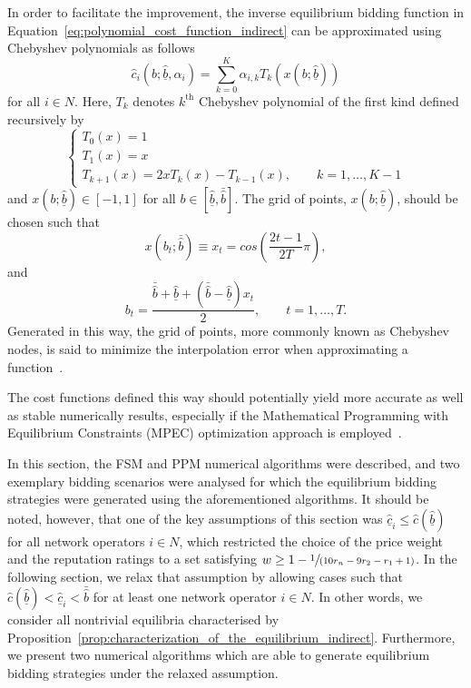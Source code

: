In order to facilitate the improvement, the inverse equilibrium bidding function in Equation~\eqref{eq:polynomial_cost_function_indirect} can be approximated using Chebyshev polynomials as follows
\begin{equation*}
  \displaystyle\hat{c}_i(b;\underline{\hat{b}},\alpha_i) = \sum_{k=0}^K \alpha_{i,k} T_k\left(x(b;\underline{\hat{b}})\right)
\end{equation*}
for all $i\in N$. Here, $T_k$ denotes $k^{\textrm{th}}$ Chebyshev polynomial of the first kind defined recursively by
\begin{equation*}
  \left\{
    \begin{array}{l}
      T_0(x) = 1\\
      T_1(x) = x\\
      T_{k+1}(x) = 2xT_k(x) - T_{k-1}(x), \qquad k=1,\ldots,K-1
    \end{array}
  \right.
\end{equation*}
and $x(b;\underline{\hat{b}})\in [-1,1]$ for all $b\in [\underline{\hat{b}}, \bar{\hat{b}}]$. The grid of points, $x(b;\underline{\hat{b}})$, should be chosen such that
\begin{equation*}
  \displaystyle x(b_t;\bar{\hat{b}}) \equiv x_t = cos\left(\frac{2t-1}{2T}\pi\right),
\end{equation*}
and
\begin{equation*}
  b_t = \frac{\bar{\hat{b}} + \underline{\hat{b}} + (\bar{\hat{b}} - \underline{\hat{b}})x_t}{2}, \qquad t = 1,\ldots,T.
\end{equation*}
Generated in this way, the grid of points, more commonly known as Chebyshev nodes, is said to minimize the interpolation error when approximating a function~\cite{Hubbard2011}.

The cost functions defined this way should potentially yield more accurate as well as stable numerically results, especially if the Mathematical Programming with Equilibrium Constraints (MPEC) optimization approach is employed~\cite{HubbardPaarsch2011,Hubbard2011}.

In this section, the FSM and PPM numerical algorithms were described, and two exemplary bidding scenarios were analysed for which the equilibrium bidding strategies were generated using the aforementioned algorithms. It should be noted, however, that one of the key assumptions of this section was $\underline{\hat{c}}_i\leq \hat{c}(\underline{\hat{b}})$ for all network operators $i\in N$, which restricted the choice of the price weight and the reputation ratings to a set satisfying $w\geq 1 - \sfrac{1}{(10r_n - 9r_2 - r_1 + 1)}$. In the following section, we relax that assumption by allowing cases such that $\hat{c}(\underline{\hat{b}}) < \underline{\hat{c}}_i < \bar{\hat{b}}$ for at least one network operator $i\in N$. In other words, we consider all nontrivial equilibria characterised by Proposition~\ref{prop:characterization_of_the_equilibrium_indirect}. Furthermore, we present two numerical algorithms which are able to generate equilibrium bidding strategies under the relaxed assumption.

